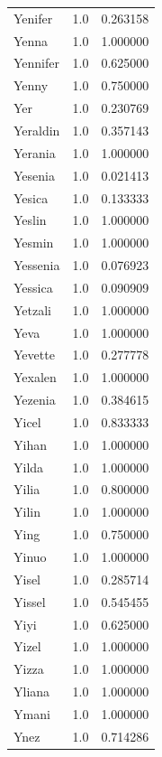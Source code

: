\documentclass[
  letterpaper,
  DIV=11,
  numbers=noendperiod]{scrreprt}
\begin{document}
\begin{tabular}{lrr}
Yenifer         &   1.0 &   0.263158 \\
Yenna           &   1.0 &   1.000000 \\
Yennifer        &   1.0 &   0.625000 \\
Yenny           &   1.0 &   0.750000 \\
Yer             &   1.0 &   0.230769 \\
Yeraldin        &   1.0 &   0.357143 \\
Yerania         &   1.0 &   1.000000 \\
Yesenia         &   1.0 &   0.021413 \\
Yesica          &   1.0 &   0.133333 \\
Yeslin          &   1.0 &   1.000000 \\
Yesmin          &   1.0 &   1.000000 \\
Yessenia        &   1.0 &   0.076923 \\
Yessica         &   1.0 &   0.090909 \\
Yetzali         &   1.0 &   1.000000 \\
Yeva            &   1.0 &   1.000000 \\
Yevette         &   1.0 &   0.277778 \\
Yexalen         &   1.0 &   1.000000 \\
Yezenia         &   1.0 &   0.384615 \\
Yicel           &   1.0 &   0.833333 \\
Yihan           &   1.0 &   1.000000 \\
Yilda           &   1.0 &   1.000000 \\
Yilia           &   1.0 &   0.800000 \\
Yilin           &   1.0 &   1.000000 \\
Ying            &   1.0 &   0.750000 \\
Yinuo           &   1.0 &   1.000000 \\
Yisel           &   1.0 &   0.285714 \\
Yissel          &   1.0 &   0.545455 \\
Yiyi            &   1.0 &   0.625000 \\
Yizel           &   1.0 &   1.000000 \\
Yizza           &   1.0 &   1.000000 \\
Yliana          &   1.0 &   1.000000 \\
Ymani           &   1.0 &   1.000000 \\
Ynez            &   1.0 &   0.714286 \\

\end{tabular}
\end{document}
